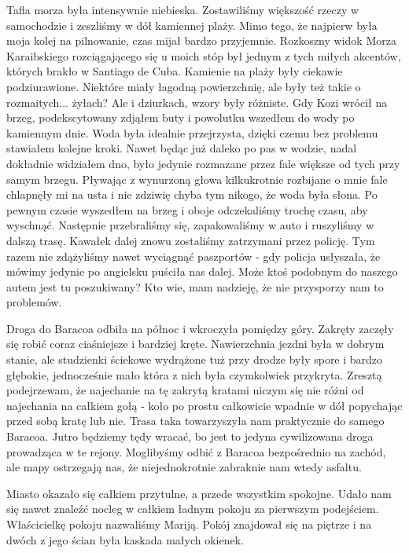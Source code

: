 \noindent Tafla morza była intensywnie niebieska.
Zostawiliśmy większość rzeczy w samochodzie i zeszliśmy w dół kamiennej plaży. 
Mimo tego, że najpierw była moja kolej na pilnowanie, czas mijał bardzo przyjemnie.
Rozkoszny widok Morza Karaibskiego rozciągającego się u moich stóp był jednym z tych miłych akcentów, których brakło w Santiago de Cuba.
Kamienie na plaży były ciekawie podziurawione.
Niektóre miały łagodną powierzchnię, ale były też takie o rozmaitych...
żyłach?
Ale i dziurkach, wzory były różniste.
Gdy Kozi wrócił na brzeg, podekscytowany zdjąłem buty i powolutku wszedłem do wody po kamiennym dnie.
Woda była idealnie przejrzysta, dzięki czemu bez problemu stawiałem kolejne kroki.
Nawet będąc już daleko po pas w wodzie, nadal dokładnie widziałem dno, było jedynie rozmazane przez fale większe od tych przy samym brzegu.
Pływając z wynurzoną głowa kilkukrotnie rozbijane o mnie fale chlapnęły mi na usta i nie zdziwię chyba tym nikogo, że woda była słona.
Po pewnym czasie wyszedłem na brzeg i oboje odczekaliśmy trochę czasu, aby wyschnąć.
Następnie przebraliśmy się, zapakowaliśmy w auto i ruszyliśmy w dalszą trasę.
Kawałek dalej znowu zostaliśmy zatrzymani przez policję.
Tym razem nie zdążyliśmy nawet wyciągnąć paszportów - gdy policja usłyszała, że mówimy jedynie po angielsku puściła nas dalej.
Może ktoś podobnym do naszego autem jest tu poszukiwany?
Kto wie, mam nadzieję, że nie przysporzy nam to problemów.
\par Droga do Baracoa odbiła na północ i wkroczyła pomiędzy góry.
Zakręty zaczęły się robić coraz ciaśniejsze i bardziej kręte.
Nawierzchnia jezdni była w dobrym stanie, ale studzienki ściekowe wydrążone tuż przy drodze były spore i bardzo głębokie, jednocześnie mało która z nich była czymkolwiek przykryta.
Zresztą podejrzewam, że najechanie na tę zakrytą kratami niczym się nie różni od najechania na całkiem gołą - koło po prostu całkowicie wpadnie w dół popychając przed sobą kratę lub nie.
Trasa taka towarzyszyła nam praktycznie do samego Baracoa.
Jutro będziemy tędy wracać, bo jest to jedyna cywilizowana droga prowadząca w te rejony.
Moglibyśmy odbić z Baracoa bezpośrednio na zachód, ale mapy ostrzegają nas, że niejednokrotnie zabraknie nam wtedy asfaltu.
\par Miasto okazało się całkiem przytulne, a przede wszystkim spokojne.
Udało nam się nawet znaleźć nocleg w całkiem ładnym pokoju za pierwszym podejściem.
Właścicielkę pokoju nazwaliśmy Mariją.
Pokój znajdował się na piętrze i na dwóch z jego ścian była kaskada małych okienek.
